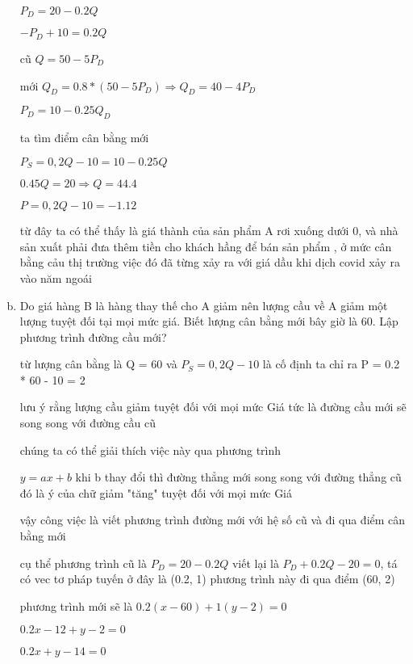 \begin{enumerate}[a.]

    $P_D = 20 - 0.2Q$

    $ -P_D  + 10 = 0.2Q$

    cũ $Q = 50 - 5P_D$

    mới $Q_D = 0.8 * (50 - 5P_D) \Rightarrow Q_D = 40 - 4P_D$

    $P_D = 10 - 0.25Q_D$

    ta tìm điểm cân bằng mới 

    $P_S = 0,2Q - 10 = 10 - 0.25Q$

    $0.45Q = 20 \Rightarrow Q = 44.4$

    $P = 0,2Q - 10 = -1.12$

    từ đây ta có thể thấy là giá thành của sản phẩm A rơi xuống dưới 0, và nhà sản xuất phải đưa thêm tiền cho khách hầng để bán sản phẩm , ở mức cân bằng cảu thị trường việc đó đã từng xảy ra với giá dầu khi dịch covid xảy ra vào năm ngoái 

    \item  Do giá hàng B là hàng thay thế cho A giảm nên lượng cầu về A giảm một lượng 
    tuyệt đối tại mọi mức giá. Biết lượng cân bằng mới bây giờ là 60. Lập phương trình 
    đường cầu mới?

    từ lượng cân bằng là Q = 60 và $P_S = 0,2Q - 10$ là cố định
     ta chỉ ra P = 0.2 * 60 - 10 = 2

     lưu ý rằng lượng cầu giảm tuyệt đối với mọi mức Giá
     tức là đường cầu mới sẽ song song với đường cầu cũ 

     chúng ta có thể giải thích việc này qua phương trình 

     $y = ax + b$ khi b thay đổi thì đường thẳng mới song song với đường thẳng cũ đó là ý của chữ giảm "tăng"  tuyệt đối với mọi mức Giá

     vậy công việc là viết phương trình đường mới với hệ số cũ 
     và đi qua điểm cân bằng mới 

     cụ thể phương trình cũ là 
     $P_D = 20 - 0.2Q$ viết lại là 
     $P_D + 0.2Q - 20 = 0$, 
     tá có vec tơ pháp tuyến ở đây là (0.2, 1)
     phương trình này đi qua  điểm (60, 2)

     phương trình mới sẽ là 
     $0.2 (x - 60) + 1 (y - 2) = 0$

     $0.2x - 12 + y - 2 = 0 $

     $0.2x + y - 14 = 0$


\end{enumerate}
